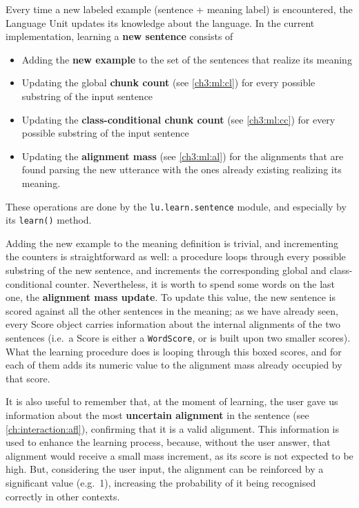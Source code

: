 Every time a new labeled example (sentence + meaning label) is encountered, the Language Unit updates its knowledge about the language. In the current implementation, learning a \textbf{new sentence} consists of
\begin{itemize}
	\item Adding the \textbf{new example} to the set of the sentences that realize its meaning
	\item Updating the global \textbf{chunk count} (see \ref{ch3:ml:cl}) for every possible substring of the input sentence
	\item Updating the \textbf{class-conditional chunk count} (see \ref{ch3:ml:cc}) for every possible substring of the input sentence
	\item Updating the \textbf{alignment mass} (see \ref{ch3:ml:al}) for the alignments that are found parsing the new utterance with the ones already existing realizing its meaning.
\end{itemize}
These operations are done by the \texttt{lu.learn.sentence} module, and especially by its \texttt{learn()} method.

Adding the new example to the meaning definition is trivial, and incrementing the counters is straightforward as well: a procedure loops through every possible substring of the new sentence, and increments the corresponding global and class-conditional counter. Nevertheless, it is worth to spend some words on the last one, the \textbf{alignment mass update}. To update this value, the new sentence is scored against all the other sentences in the meaning; as we have already seen, every Score object carries information about the internal alignments of the two sentences (i.e.\ a Score is either a \texttt{WordScore}, or is built upon two smaller scores). What the learning procedure does is looping through this boxed scores, and for each of them adds its numeric value to the alignment mass already occupied by that score.

It is also useful to remember that, at the moment of learning, the user gave us information about the most \textbf{uncertain alignment} in the sentence (see \ref{ch:interaction:afl}), confirming that it is a valid alignment. This information is used to enhance the learning process, because, without the user answer, that alignment would receive a small mass increment, as its score is not expected to be high. But, considering the user input, the alignment can be reinforced by a significant value (e.g.\ 1), increasing the probability of it being recognised correctly in other contexts.

